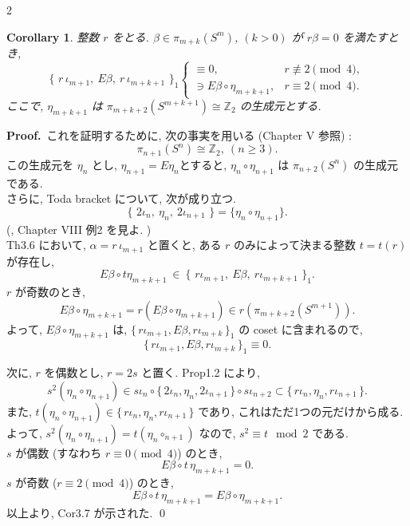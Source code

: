 \documentclass[10pt, leqno]{ltjsarticle}
\newcommand{\Ex}{E}        %
\newcommand{\toda}[1]{\{\,#1\,\}}              %
\newcommand{\todai}[2][]{\{\,#2\,\}_{#1}}      %
\newcommand{\pis}[2]{\pi_{#1}(#2)}       %
\numberwithin{equation}{section}
\theoremstyle{plain}
\newtheorem{corollary}[theorem]{Corollary}
\theoremstyle{definition}
\theoremstyle{remark}
\begin{document}
\begin{paracol}{2}

\begin{corollary}\label{cor:3.7}
整数 $r$ をとる. $\beta\in\pis{m+k}{S^m}$, $(k>0)$ が $r\beta=0$ を満たすとき,
\[
\todai[1]{\,r\,\iota_{m+1},\ \Ex\beta,\ r\,\iota_{m+k+1}\,}
\begin{cases}
\equiv 0, & r\not\equiv 2 \pmod 4,\\[4pt]
\ni\Ex\beta\circ \eta_{m+k+1}, & r\equiv 2 \pmod 4 .
\end{cases}
\]
ここで, $\eta_{m+k+1}$ は $\pis{m+k+2}{S^{m+k+1}}\cong\mathbb{Z}_2$ の生成元とする. 
\end{corollary}

\textbf{Proof.}\ 
これを証明するために, 次の事実を用いる (Chapter V 参照) :
\[
\pis{n+1}{S^n}\cong\mathbb{Z}_2,\ (n\ge3) .
\]
この生成元を $\eta_n$ とし, $\eta_{n+1}=E \eta_{n}$とすると, 
\(\eta_n\circ\eta_{n+1}\) は \(\pis{n+2}{S^n}\) の生成元である. \\
さらに, Toda bracket について, 次が成り立つ. 
\[
\toda{\,2\iota_n,\ \eta_n,\ 2\iota_{n+1}\,}
=\{\eta_n\circ\eta_{n+1}\}.
\]
(\cite{Toda1952}, Chapter VIII 例2 を見よ. )\\
Th3.6 において, $\alpha=r\,\iota_{m+1}$ と置くと, 
ある \(r\) のみによって決まる整数 $t=t(r)$ が存在し, 
\[
\Ex\beta\circ t\eta_{m+k+1}
\ \in\ \todai[1]{\,r\iota_{m+1},\ \Ex\beta,\ r\iota_{m+k+1}\,}.
\]
$r$ が奇数のとき, 
\[
E\beta\circ\eta_{m+k+1}
= r(E\beta\circ\eta_{m+k+1})
\in r (\pis{m+k+2}{S^{m+1}}) .
\]
よって, \(E\beta\circ\eta_{m+k+1}\) は, 
\(\todai[1]{r\iota_{m+1}, E\beta, r\iota_{m+k}}\) 
の coset に含まれるので, 
\[
\todai[1]{r\iota_{m+1}, E\beta, r\iota_{m+k}} \equiv 0.
\]

次に, $r$ を偶数とし, $r=2s$ と置く. 
Prop1.2 により, 
\[
s^2(\eta_n\circ\eta_{n+1})
\in s\iota_n\circ\toda{2\iota_n, \eta_n, 2\iota_{n+1}}\circ s\iota_{n+2}
\subset \toda{r\iota_n, \eta_n, r\iota_{n+1}} .
\]
また, 
\(t(\eta_n\circ\eta_{n+1}) \in \toda{r\iota_n, \eta_n, r\iota_{n+1}}\)
であり, これはただ1つの元だけから成る. \\
よって, 
\(
s^2(\eta_n\circ\eta_{n+1}) = t(\eta_n\circ_{n+1})
\)
なので, \(s^2\equiv t\mod 2\) である. \\
$s$ が偶数 (すなわち $r\equiv0\pmod4$) のとき, 
\[
\Ex\beta\circ t\,\eta_{m+k+1}=0 .
\]
$s$ が奇数 ($r\equiv2\pmod4$) のとき, 
\[
\Ex\beta\circ t\,\eta_{m+k+1}=\Ex\beta\circ \eta_{m+k+1} .
\]
以上より, Cor3.7 が示された. 
\qed


\end{paracol}
\end{document}
